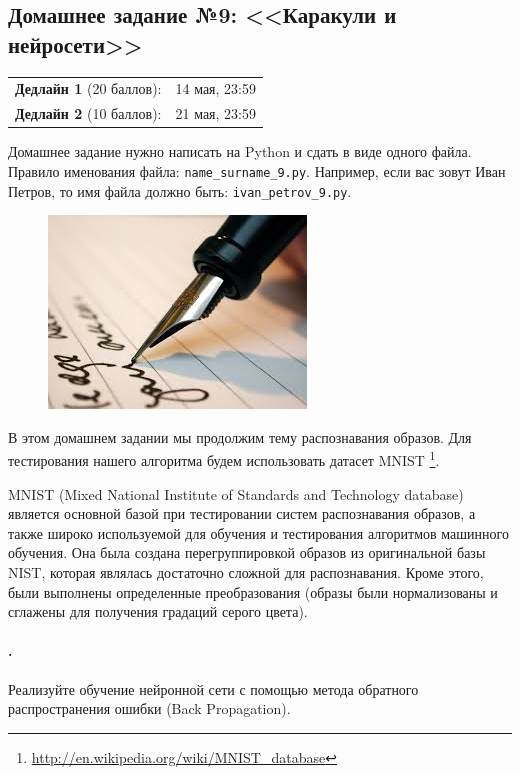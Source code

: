 \documentclass[a4paper,12pt]{article}
\newcounter{mypar}
\newcommand{\mypar}{\stepcounter{mypar}\paragraph{\arabic{mypar}.}}
\begin{document}
\subsection*{Домашнее задание №9: <<Каракули и нейросети>>}

\begin{tabular}{@{}lr}
  \textbf{Дедлайн 1} (20 баллов): & 14 мая, 23:59 \\
  \textbf{Дедлайн 2} (10 баллов): & 21 мая, 23:59
\end{tabular}

Домашнее задание нужно написать на Python и сдать в виде одного файла.
Правило именования файла: \texttt{name\_surname\_9.py}. Например, если
вас зовут Иван Петров, то имя файла должно быть: \texttt{ivan\_petrov\_9.py}.

\makebox[\linewidth]{\hrulefill}

\begin{figure}[h!]
  \centering
  \includegraphics[width=.7\linewidth]{images/images}
\end{figure}


В этом домашнем задании мы продолжим тему распознавания образов. Для тестирования нашего алгоритма будем использовать датасет MNIST \footnote{\url{http://en.wikipedia.org/wiki/MNIST_database}}. 

MNIST (Mixed National Institute of Standards and Technology database) является основной базой при тестировании систем распознавания образов, а также широко используемой для обучения и тестирования алгоритмов машинного обучения. Она была создана перегруппировкой образов из оригинальной базы NIST, которая являлась достаточно сложной для распознавания. Кроме этого, были выполнены определенные преобразования (образы были нормализованы и сглажены для получения градаций серого цвета). 

\mypar Реализуйте обучение нейронной сети с помощью метода обратного распространения ошибки (Back Propagation). 
\end{document}
